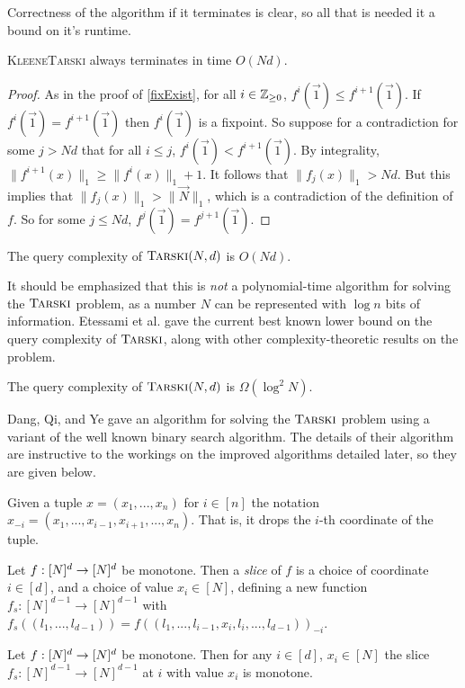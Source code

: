 Correctness of the algorithm if it terminates is clear, so all that is needed it a bound on it's runtime.
\begin{lemma}
  \textsc{KleeneTarski} always terminates in time $O(Nd)$.
\end{lemma}
\begin{proof}
  As in the proof of \cref{fixExist}, for all $i \in \mathbb{Z}_{\geq 0}$, $f^i(\vec{1}) \leq f^{i+1}(\vec{1})$. If $f^i(\vec{1}) = f^{i+1}(\vec{1})$
  then $f^i(\vec{1})$ is a fixpoint. So suppose for a contradiction for some $j > Nd$ that for all $i \leq j$, $f^i(\vec{1}) < f^{i+1}(\vec{1})$. 
  By integrality, $\|f^{i+1}(x)\|_1 \geq \|f^i(x)\|_1 + 1$. It follows that $\|f_j(x)\|_1 > Nd$. But this implies that
  $\|f_j(x)\|_1 > \|\vec{N}\|_1$, which is a contradiction of the definition of $f$. So for some $j \leq Nd$, $f^j(\vec{1}) = f^{j+1}(\vec{1})$.
\end{proof}
\begin{theorem}
  The query complexity of $\textsc{Tarski}(N,d)$ is $O(Nd)$.
\end{theorem}
It should be emphasized that this is \emph{not} a polynomial-time algorithm for solving the $\textsc{Tarski}$ problem, as a number
$N$ can be represented with $\log n$ bits of information. 
Etessami et al. gave the current best known lower bound on the query complexity of $\textsc{Tarski}$, along with other complexity-theoretic results
on the problem.
\begin{theorem}
  The query complexity of $\textsc{Tarski}(N, d)$ is $\Omega(\log^2N)$.
\end{theorem}
Dang, Qi, and Ye gave an algorithm for solving the $\textsc{Tarski}$ problem\citep{dangQiYe} using a variant of the well
known binary search algorithm. The details of their algorithm are instructive
to the workings on the improved algorithms detailed  later, so they are given below.
\begin{notation}
  Given a tuple $x = (x_1, ..., x_n)$ for $i \in [n]$ the notation $x_{-i} = (x_1, ..., x_{i-1}, x_{i+1}, ..., x_n)$. That is, it drops
  the $i$-th coordinate of the tuple.
\end{notation}
\begin{definition}[Slice]
  Let $f : [N]^d \to [N]^d$ be monotone. Then a \emph{slice} of $f$ is a choice of coordinate $i \in [d]$,
  and a choice of value $x_i \in [N]$, defining a new function $f_s : [N]^{d-1} \to [N]^{d-1}$ with
  $f_s((l_1, ..., l_{d-1})) = f((l_1, ..., l_{i-1},  x_i, l_i, ..., l_{d-1}))_{-i}$.
\end{definition}
\begin{lemma}
  Let $f : [N]^d \to [N]^d$ be monotone. Then for any $i \in [d]$, $x_i \in [N]$ the slice $f_s : [N]^{d-1} \to [N]^{d-1}$ at $i$ with value $x_i$  
  is monotone. 
\end{lemma}
